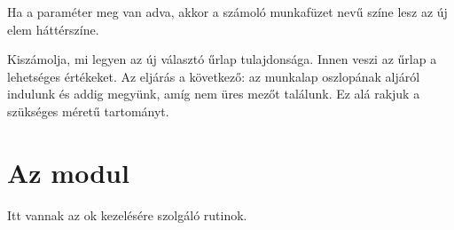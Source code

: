 \begin{description}
  Ha a  paraméter meg van adva, akkor a számoló munkafüzet
   nevű színe lesz az új elem háttérszíne. 
\item[\code{newListFillRange}] Kiszámolja, mi legyen az új
   választó űrlap  tulajdonsága. Innen veszi
  az űrlap a lehetséges értékeket. Az eljárás a következő: az 
  munkalap  oszlopának aljáról indulunk és addig megyünk,
  amíg nem üres mezőt találunk. 
  Ez alá rakjuk a szükséges méretű tartományt.
\end{description}


\section{Az  modul}\label{sec:6.3}
Itt vannak az ok kezelésére szolgáló rutinok.

